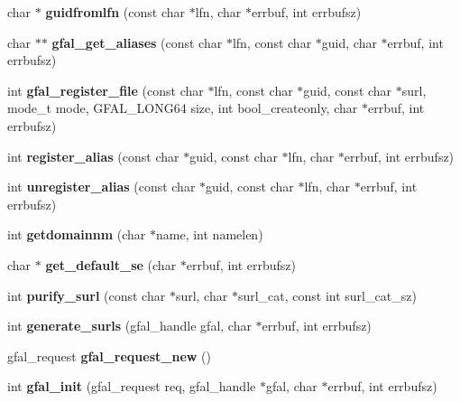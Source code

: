 \begin{CompactItemize}
\item 
char $\ast$ \textbf{guidfromlfn} (const char $\ast$lfn, char $\ast$errbuf, int errbufsz)\label{gfal__common_8c_fffd314fbaeab0aff9beb7c5b47ab13d}

\item 
char $\ast$$\ast$ \textbf{gfal\_\-get\_\-aliases} (const char $\ast$lfn, const char $\ast$guid, char $\ast$errbuf, int errbufsz)\label{group__internal__group_g25d4ae6bef6570590efbc8548e7d79e2}

\item 
int \textbf{gfal\_\-register\_\-file} (const char $\ast$lfn, const char $\ast$guid, const char $\ast$surl, mode\_\-t mode, GFAL\_\-LONG64 size, int bool\_\-createonly, char $\ast$errbuf, int errbufsz)\label{group__internal__group_gdb09f20d086253b45c5d2896be95b4a9}

\item 
int \textbf{register\_\-alias} (const char $\ast$guid, const char $\ast$lfn, char $\ast$errbuf, int errbufsz)\label{gfal__common_8c_4bb13064562b552627698601dda010cd}

\item 
int \textbf{unregister\_\-alias} (const char $\ast$guid, const char $\ast$lfn, char $\ast$errbuf, int errbufsz)\label{gfal__common_8c_8877542e026eef3292c7f5ab44c55124}

\item 
int \textbf{getdomainnm} (char $\ast$name, int namelen)\label{gfal__common_8c_446a829e4f333d3a0364ab0f2b5a2dc7}

\item 
char $\ast$ \textbf{get\_\-default\_\-se} (char $\ast$errbuf, int errbufsz)\label{gfal__common_8c_806f5f7bc913922610d15e88a78b7294}

\item 
int \textbf{purify\_\-surl} (const char $\ast$surl, char $\ast$surl\_\-cat, const int surl\_\-cat\_\-sz)\label{gfal__common_8c_b082f9f86bdeee9d7d01f1e2cf9c7c58}

\item 
int \textbf{generate\_\-surls} (gfal\_\-handle gfal, char $\ast$errbuf, int errbufsz)\label{gfal__common_8c_b2ab5186548d0aa6b5f9471b0ccb2c1e}

\item 
gfal\_\-request \textbf{gfal\_\-request\_\-new} ()\label{gfal__common_8c_b5d503849656335232e56583b376ee22}

\item 
int \textbf{gfal\_\-init} (gfal\_\-request req, gfal\_\-handle $\ast$gfal, char $\ast$errbuf, int errbufsz)\label{gfal__common_8c_6aed69bb7e332471c482de3372f864a7}


\end{CompactItemize}
